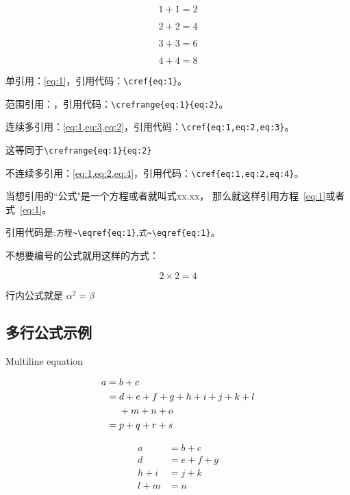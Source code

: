 \begin{equation}
1+1=2 \label{eq:1}
\end{equation}

\begin{equation}
2+2=4 \label{eq:2}
\end{equation}

\begin{equation}
3+3=6 \label{eq:3}
\end{equation}

\begin{equation}
4+4=8 \label{eq:4}
\end{equation}

单引用：\cref{eq:1}，引用代码：\verb|\cref{eq:1}|。

范围引用：，引用代码：\verb|\crefrange{eq:1}{eq:2}|。

连续多引用：\cref{eq:1,eq:3,eq:2}，引用代码：\verb|\cref{eq:1,eq:2,eq:3}|。

这等同于\verb|\crefrange{eq:1}{eq:2}|

不连续多引用：\cref{eq:1,eq:2,eq:4}，引用代码：\verb|\cref{eq:1,eq:2,eq:4}|。



当想引用的``公式"是一个方程或者就叫式xx.xx，
那么就这样引用方程~\eqref{eq:1}或者式~\eqref{eq:1}。

引用代码是:\verb|方程~\eqref{eq:1}|,\verb|式~\eqref{eq:1}|。

不想要编号的公式就用这样的方式：

 \[ 2\times 2=4 \]

 行内公式就是  $ \alpha ^2= \beta $

\subsection{多行公式示例}{Multiline equation}

\begin{align}
a ={} & b + c \\
={} & d + e + f + g + h + i
+ j + k + l \notag \\
& + m + n + o \\
={} & p + q + r + s
\end{align}

\begin{equation}
\begin{aligned}
a &= b + c \\
d &= e + f + g \\
h + i &= j + k \\
l + m &= n
\end{aligned} \label{eq:5}
\end{equation}

